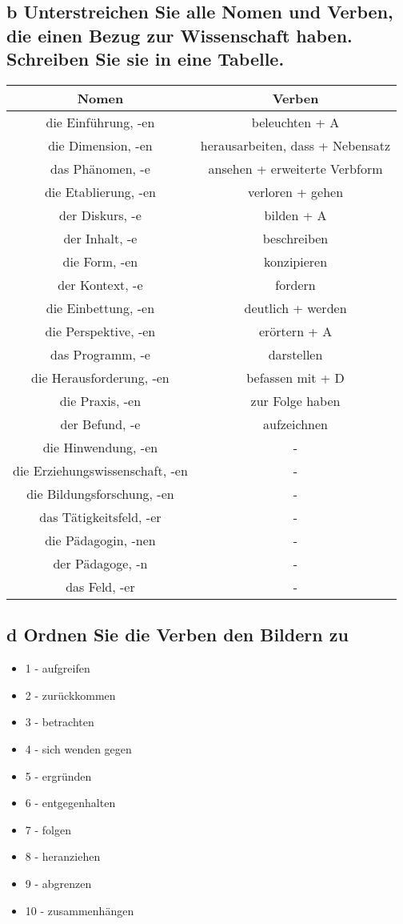 \documentclass{article}
\begin{document}
	\subsection*{\textbf{b} Unterstreichen Sie alle Nomen und Verben, die einen Bezug zur Wissenschaft haben. Schreiben Sie sie in eine Tabelle.}
	\begin{center}
	\begin{tabular}{| c | c |}
		\toprule
		\textbf{Nomen} & \textbf{Verben} \\ \midrule
		die Einführung, -en & beleuchten + A \\
		die Dimension, -en & herausarbeiten, dass + Nebensatz \\
		das Phänomen, -e & ansehen + erweiterte Verbform \\
		die Etablierung, -en & verloren + gehen \\
		der Diskurs, -e & bilden + A \\
		der Inhalt, -e & beschreiben \\
		die Form, -en & konzipieren \\
		der Kontext, -e & fordern \\
		die Einbettung, -en & deutlich + werden \\
		die Perspektive, -en & erörtern + A \\
		das Programm, -e & darstellen \\
		die Herausforderung, -en & befassen mit + D \\
		die Praxis, -en & zur Folge haben \\
		der Befund, -e & aufzeichnen \\
		die Hinwendung, -en & - \\
		die Erziehungswissenschaft, -en & - \\
		die Bildungsforschung, -en & - \\
		das Tätigkeitsfeld, -er & - \\
		die Pädagogin, -nen & - \\
		der Pädagoge, -n & - \\
		das Feld, -er & - \\
		\bottomrule
	\end{tabular}
	\end{center}

	\subsection*{\textbf{d} Ordnen Sie die Verben den Bildern zu}
	\begin{itemize}
		\item{1 - aufgreifen}
		\item{2 - zurückkommen}
		\item{3 - betrachten}
		\item{4 - sich wenden gegen}
		\item{5 - ergründen}
		\item{6 - entgegenhalten}
		\item{7 - folgen}
		\item{8 - heranziehen}
		\item{9 - abgrenzen}
		\item{10 - zusammenhängen}
	\end{itemize}
\end{document}
